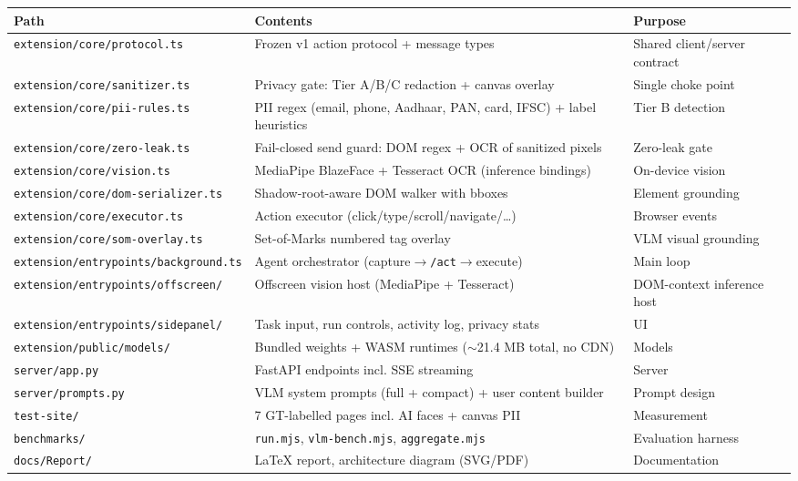 \documentclass[11pt,a4paper]{article}
\newcommand{\code}[1]{\texttt{#1}}
\renewcommand{\arraystretch}{1.25}
\begin{document}
\begin{itemize}
\begin{table}[H]
\small
\renewcommand{\arraystretch}{1.25}
\begin{tabularx}{\linewidth}{@{}lXX@{}}
\toprule
\textbf{Path} & \textbf{Contents} & \textbf{Purpose} \\
\midrule
\code{extension/core/protocol.ts} & Frozen v1 action protocol + message types & Shared client/server contract \\
\code{extension/core/sanitizer.ts} & Privacy gate: Tier A/B/C redaction + canvas overlay & Single choke point \\
\code{extension/core/pii-rules.ts} & PII regex (email, phone, Aadhaar, PAN, card, IFSC) + label heuristics & Tier B detection \\
\code{extension/core/zero-leak.ts} & Fail-closed send guard: DOM regex + OCR of sanitized pixels & Zero-leak gate \\
\code{extension/core/vision.ts} & MediaPipe BlazeFace + Tesseract OCR (inference bindings) & On-device vision \\
\code{extension/core/dom-serializer.ts} & Shadow-root-aware DOM walker with bboxes & Element grounding \\
\code{extension/core/executor.ts} & Action executor (click/type/scroll/navigate/\ldots) & Browser events \\
\code{extension/core/som-overlay.ts} & Set-of-Marks numbered tag overlay & VLM visual grounding \\
\code{extension/entrypoints/background.ts} & Agent orchestrator (capture$\rightarrow$\code{/act}$\rightarrow$execute) & Main loop \\
\code{extension/entrypoints/offscreen/} & Offscreen vision host (MediaPipe + Tesseract) & DOM-context inference host \\
\code{extension/entrypoints/sidepanel/} & Task input, run controls, activity log, privacy stats & UI \\
\code{extension/public/models/} & Bundled weights + WASM runtimes ($\sim$21.4 MB total, no CDN) & Models \\
\code{server/app.py} & FastAPI endpoints incl. SSE streaming & Server \\
\code{server/prompts.py} & VLM system prompts (full + compact) + user content builder & Prompt design \\
\code{test-site/} & 7 GT-labelled pages incl. AI faces + canvas PII & Measurement \\
\code{benchmarks/} & \code{run.mjs}, \code{vlm-bench.mjs}, \code{aggregate.mjs} & Evaluation harness \\
\code{docs/Report/} & LaTeX report, architecture diagram (SVG/PDF) & Documentation \\
\bottomrule
\end{tabularx}
\end{table}


\end{itemize}
\end{document}
